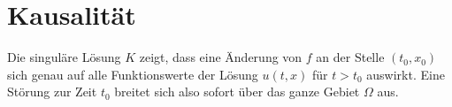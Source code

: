 %
%
%
\section{Kausalität}
Die singuläre Lösung $K$ zeigt, dass eine Änderung von $f$ an der Stelle
$(t_0,x_0)$ sich genau auf alle Funktionswerte der Lösung $u(t,x)$ für
$t>t_0$ auswirkt. Eine Störung zur Zeit $t_0$ breitet sich also sofort
über das ganze Gebiet $\Omega$ aus.

